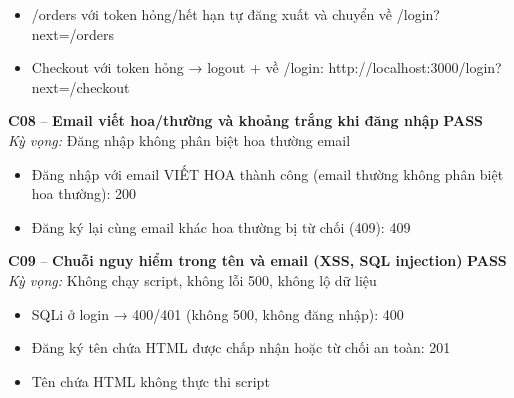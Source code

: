 \documentclass[a4paper,11pt]{article}
\newcommand{\ok}{\textcolor{okgreen}{\textbf{PASS}}}
\begin{document}
\begin{itemize}\footnotesize
\item \tick /orders với token hỏng/hết hạn tự đăng xuất và chuyển về /login?next=/orders
\item \tick Checkout với token hỏng → logout + về /login: http://localhost:3000/login?next=/checkout
\end{itemize}
\begin{minipage}{\textwidth}\vspace{4pt}\textbf{\textcolor{brew}{C08}} -- \textbf{Email viết hoa/thường và khoảng trắng khi đăng nhập} \hfill \ok\\
{\small\emph{Kỳ vọng:} Đăng nhập không phân biệt hoa thường email}
\end{minipage}
\begin{itemize}\footnotesize
\item \tick Đăng nhập với email VIẾT HOA thành công (email thường không phân biệt hoa thường): 200
\item \tick Đăng ký lại cùng email khác hoa thường bị từ chối (409): 409
\end{itemize}
\begin{minipage}{\textwidth}\vspace{4pt}\textbf{\textcolor{brew}{C09}} -- \textbf{Chuỗi nguy hiểm trong tên và email (XSS, SQL injection)} \hfill \ok\\
{\small\emph{Kỳ vọng:} Không chạy script, không lỗi 500, không lộ dữ liệu}
\end{minipage}
\begin{itemize}\footnotesize
\item \tick SQLi ở login → 400/401 (không 500, không đăng nhập): 400
\item \tick Đăng ký tên chứa HTML được chấp nhận hoặc từ chối an toàn: 201
\item \tick Tên chứa HTML không thực thi script
\end{itemize}
\end{document}
